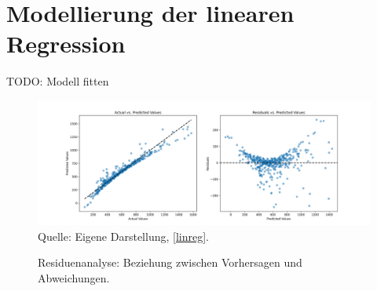 \section{Modellierung der linearen Regression}

TODO: Modell fitten

\begin{figure}[h]
    \caption{Residuenanalyse: Beziehung zwischen Vorhersagen und Abweichungen.}
    \includegraphics[width=1\textwidth]{../scripts/images/residuals.png}
    Quelle: Eigene Darstellung, \ref{linreg}.
    \label{pic:residuals}
\end{figure}